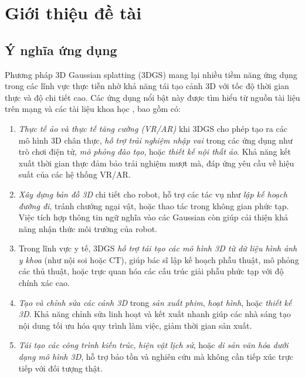 \section{Giới thiệu đề tài}
    \subsection{Ý nghĩa ứng dụng} Phương pháp 3D Gaussian splatting (3DGS) mang lại nhiều tiềm năng ứng dụng trong các lĩnh vực thực tiễn nhờ khả năng tái tạo cảnh 3D với tốc độ thời gian thực và độ chi tiết cao. Các ứng dụng nổi bật này được tìm hiểu từ nguồn tài liệu trên mạng và các tài liệu khoa học \cite{b2}, bao gồm có:
    
    \begin{enumerate}
        \item \textit{Thực tế ảo và thực tế tăng cường (VR/AR)} khi 3DGS cho phép tạo ra các mô hình 3D chân thực, \textit{hỗ trợ trải nghiệm nhập vai} trong các ứng dụng như trò chơi điện tử, \textit{mô phỏng đào tạo}, hoặc \textit{thiết kế nội thất ảo}. Khả năng kết xuất thời gian thực đảm bảo trải nghiệm mượt mà, đáp ứng yêu cầu về hiệu suất của các hệ thống VR/AR. 
        
        \item \textit{Xây dựng bản đồ 3D} chi tiết cho robot, hỗ trợ các tác vụ như \textit{lập kế hoạch đường đi}, tránh chướng ngại vật, hoặc thao tác trong không gian phức tạp. Việc tích hợp thông tin ngữ nghĩa vào các Gaussian còn giúp cải thiện khả năng nhận thức môi trường của robot. 
        
        \item Trong lĩnh vực y tế, 3DGS \textit{hỗ trợ tái tạo các mô hình 3D từ dữ liệu hình ảnh y khoa} (như nội soi hoặc CT), giúp bác sĩ lập kế hoạch phẫu thuật, mô phỏng các thủ thuật, hoặc trực quan hóa các cấu trúc giải phẫu phức tạp với độ chính xác cao. 
        
        \item \textit{Tạo và chỉnh sửa các cảnh 3D} trong \textit{sản xuất phim}, \textit{hoạt hình}, hoặc \textit{thiết kế 3D}. Khả năng chỉnh sửa linh hoạt và kết xuất nhanh giúp các nhà sáng tạo nội dung tối ưu hóa quy trình làm việc, giảm thời gian sản xuất. 
        
        \item \textit{Tái tạo các công trình kiến trúc}, \textit{hiện vật lịch sử}, hoặc \textit{di sản văn hóa dưới dạng mô hình 3D}, hỗ trợ bảo tồn và nghiên cứu mà không cần tiếp xúc trực tiếp với đối tượng thật.
    \end{enumerate}
    
